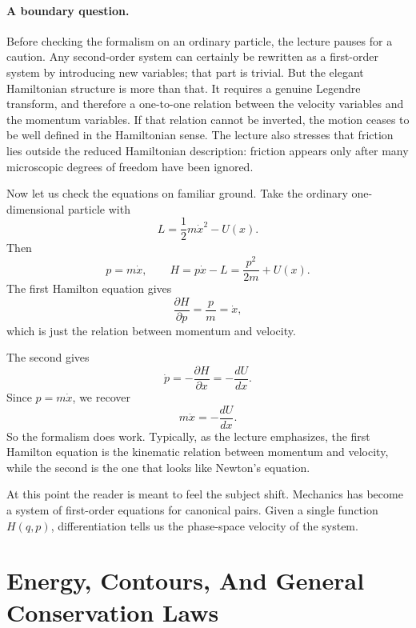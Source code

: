 \paragraph{A boundary question.}
Before checking the formalism on an ordinary particle, the lecture pauses for a caution. Any second-order system can certainly be rewritten as a first-order system by introducing new variables; that part is trivial. But the elegant Hamiltonian structure is more than that. It requires a genuine Legendre transform, and therefore a one-to-one relation between the velocity variables and the momentum variables. If that relation cannot be inverted, the motion ceases to be well defined in the Hamiltonian sense. The lecture also stresses that friction lies outside the reduced Hamiltonian description: friction appears only after many microscopic degrees of freedom have been ignored.

Now let us check the equations on familiar ground. Take the ordinary one-dimensional particle with
\begin{equation}
L=\frac12 m\dot x^2-U(x).
\end{equation}
Then
\begin{equation}
p=m\dot x,
\qquad
H=p\dot x-L=\frac{p^2}{2m}+U(x).
\end{equation}
The first Hamilton equation gives
\begin{equation}
\frac{\partial H}{\partial p}=\frac{p}{m}=\dot x,
\end{equation}
which is just the relation between momentum and velocity.

The second gives
\begin{equation}
\dot p=-\frac{\partial H}{\partial x}=-\frac{dU}{dx}.
\end{equation}
Since \(p=m\dot x\), we recover
\begin{equation}
m\ddot x=-\frac{dU}{dx}.
\end{equation}
So the formalism does work. Typically, as the lecture emphasizes, the first Hamilton equation is the kinematic relation between momentum and velocity, while the second is the one that looks like Newton's equation.

At this point the reader is meant to feel the subject shift. Mechanics has become a system of first-order equations for canonical pairs. Given a single function \(H(q,p)\), differentiation tells us the phase-space velocity of the system.

\section{Energy, Contours, And General Conservation Laws}

